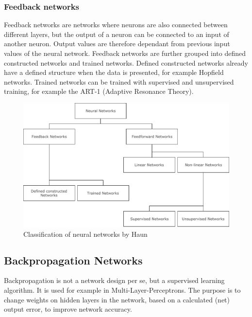 \subsubsection{Feedback networks}\label{feedback-networks}

Feedback networks are networks where neurons are also connected between
different layers, but the output of a neuron can be connected to an
input of another neuron. Output values are therefore dependant from
previous input values of the neural network. \cite{haun1998simulation}
Feedback networks are further grouped into defined constructed networks
and trained networks. Defined constructed networks already have a
defined structure when the data is presented, for example Hopfield
networks. Trained networks can be trained with supervised and
unsupervised training, for example the ART-1 (Adaptive Resonance
Theory). \cite{haun1998simulation}

\begin{figure}
\centering
\includegraphics[width=15.00000cm]{images/nn_classification}
\caption{Classification of neural networks by Haun
\cite{haun1998simulation} \label{nn_class_haun}}
\end{figure}

\subsection{Backpropagation Networks}\label{backpropagation-networks}

Backpropagation is not a network design per se, but a supervised
learning algorithm. It is used for example in Multi-Layer-Perceptrons.
The purpose is to change weights on hidden layers in the network, based
on a calculated (net) output error, to improve network accuracy.
\cite{nn-froehlich}

